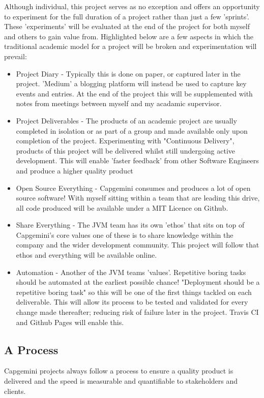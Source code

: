 Although individual, this project serves as no exception and offers an
opportunity to experiment for the full duration of a project rather than just a
few 'sprints'. These 'experiments' will be evaluated at the end of
the project for both myself and others to gain value from. Highlighted below
are a few aspects in which the traditional academic model for a project will
be broken and experimentation will prevail:
 \begin{itemize}
  \item Project Diary - Typically this is done on paper, or captured later in
   the project. 'Medium' a blogging platform will instead be used to
   capture key events and entries. At the end of the project this will be
   supplemented with notes from meetings between myself and my acadamic
   supervisor.
  \item Project Deliverables - The products of an academic project are usually
  completed in isolation or as part of a group and made available only upon
  completion of the project. Experimenting with "Continuous Delivery",
  products of this project will be delivered whilst still undergoing active
  development. This will enable 'faster feedback' from other Software
  Engineers and produce a higher quality product
  \item Open Source Everything - Capgemini consumes and
  produces a lot of open source software! With myself sitting within a team
  that are leading this drive, all code produced will be available under a MIT
  Licence on Github.
  \item Share Everything - The JVM team has its own 'ethos' that sits on top
  of Capgemini's core values one of these is to share knowledge within the
  company and the wider development community. This project will follow that
  ethos and everything will be available online.
  \item Automation - Another of the JVM teams 'values'. Repetitive boring tasks
  should be automated at the earliest possible chance! "Deployment should be a
   repetitive boring task" so this will be one of the first things tackled on
   each deliverable. This will allow its process to be tested and validated
   for every change made thereafter; reducing risk of failure later in the
   project. Travis CI and Github Pages will enable this.
 \end{itemize}

\subsection{A Process}
Capgemini projects always follow a process to ensure a quality
product is delivered and the speed is measurable and quantifiable to
stakeholders and clients.

